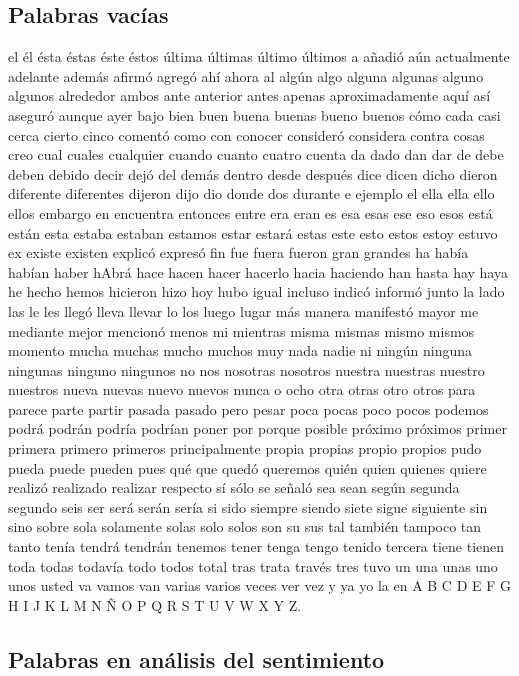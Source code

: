 \documentclass[../all.tex]{subfiles}
\begin{document}
\subsection{Palabras vacías}
    el él ésta éstas éste éstos última últimas último últimos  a añadió aún actualmente adelante además afirmó agregó ahí ahora al  algún algo alguna algunas alguno algunos alrededor ambos ante anterior antes  apenas aproximadamente aquí así aseguró aunque ayer bajo bien buen  buena buenas bueno buenos cómo cada casi cerca cierto cinco comentó como
    con conocer consideró considera contra cosas creo cual cuales cualquier cuando  cuanto cuatro cuenta da dado dan dar de debe deben debido decir dejó del  demás dentro desde después dice dicen dicho dieron diferente diferentes dijeron
    dijo dio donde dos durante e ejemplo el ella ella ello ellos embargo en  encuentra entonces entre era eran es  esa esas ese eso esos está están esta  estaba estaban estamos estar estará estas este esto estos estoy estuvo ex existe existen explicó expresó fin fue fuera fueron gran grandes ha había habían haber hAbrá hace hacen hacer hacerlo
    hacia haciendo han hasta hay haya he hecho hemos hicieron hizo hoy hubo igual incluso indicó informó
    junto la lado las le les llegó  lleva llevar lo los luego lugar  más manera manifestó mayor me mediante  mejor mencionó menos mi mientras misma  mismas mismo mismos momento mucha muchas  mucho muchos muy nada nadie ni ningún
    ninguna ningunas ninguno ningunos no nos  nosotras nosotros nuestra nuestras nuestro nuestros nueva nuevas nuevo nuevos nunca  o ocho otra otras otro otros para parece parte partir pasada pasado pero  pesar poca pocas poco pocos podemos
    podrá podrán podría podrían poner por  porque posible próximo próximos primer primera primero primeros principalmente propia  propias propio propios pudo pueda puede pueden pues qué que quedó  queremos quién quien quienes quiere
    realizó realizado realizar respecto sí  sólo se señaló sea sean según segunda segundo seis ser será serán sería si  sido siempre siendo siete sigue siguiente sin sino sobre sola solamente solas solo  solos son su sus tal también tampoco
    tan tanto tenía tendrá tendrán tenemos  tener tenga tengo tenido tercera tiene tienen toda todas todavía todo todos  total tras trata través tres tuvo un una unas uno unos usted va  vamos van varias varios veces ver vez y ya yo la en  A B C D E F G H I J K L M N Ñ O P Q R S T U V W X Y Z.

\newpage
\subsection{Palabras en análisis del sentimiento}
\end{document}
